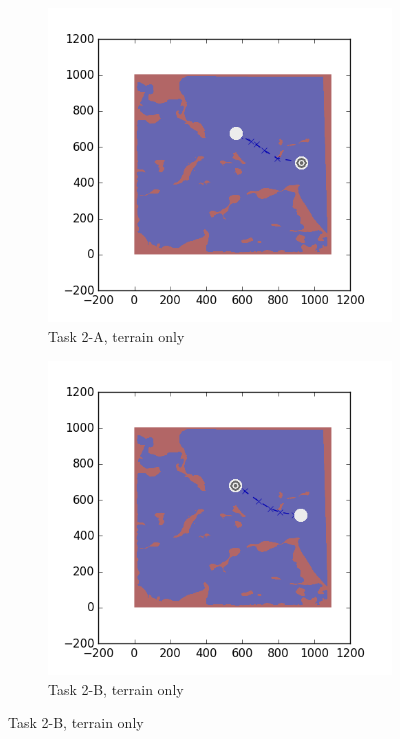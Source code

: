 \documentclass{tamuccthesis}
\begin{document}
\begin{figure}[H]
    \centering
    \begin{subfigure}[b]{0.4\textwidth}
        \centering
        \includegraphics[width=\textwidth,trim={4cm 3cm 2cm 3cm},clip]{EXP3RG_PathBa_-1_-1_0_0.png}
        \caption{Task 2-A, terrain only}
        \label{fig:Path_2-A_terrain}
    \end{subfigure}
    \hfill
    \begin{subfigure}[b]{0.4\textwidth}  
        \centering 
        \includegraphics[width=\textwidth,trim={4cm 3cm 2cm 3cm},clip]{EXP3RG_PathBb_-1_-1_0_0.png}
        \caption{Task 2-B, terrain only}  
        \label{fig:Path_2-B_terrain}
    \end{subfigure}
    

\end{figure}
\end{document}
